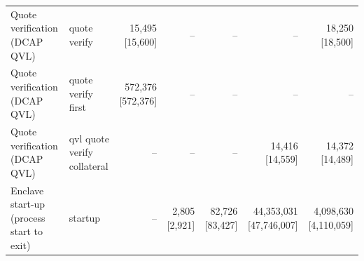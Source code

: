 \begin{table}[t]
\begin{tabular}{llrrrrr}
Quote verification (DCAP QVL) & quote verify & 15,495 [15,600] & – & – & – & 18,250 [18,500] \\
Quote verification (DCAP QVL) & quote verify first & 572,376 [572,376] & – & – & – & – \\
Quote verification (DCAP QVL) & qvl quote verify collateral & – & – & – & 14,416 [14,559] & 14,372 [14,489] \\
Enclave start-up (process start to exit) & startup & – & 2,805 [2,921] & 82,726 [83,427] & 44,353,031 [47,746,007] & 4,098,630 [4,110,059] \\
\bottomrule
\end{tabular}
\end{table}
